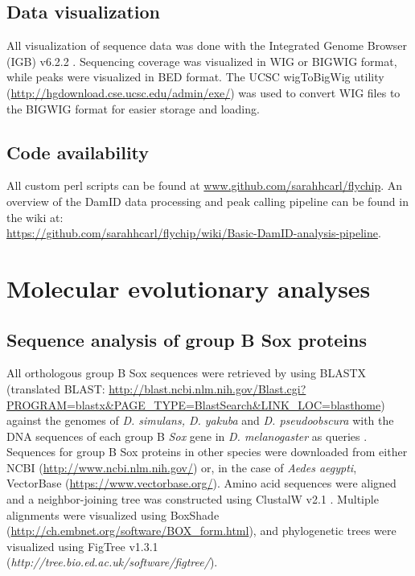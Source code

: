 \subsection{Data visualization}
All visualization of sequence data was done with the Integrated Genome Browser (IGB) v6.2.2 \citep{nicol_integrated_2009}. Sequencing coverage was visualized in WIG or BIGWIG format, while peaks were visualized in BED format. The UCSC wigToBigWig utility (\url{http://hgdownload.cse.ucsc.edu/admin/exe/}) was used to convert WIG files to the BIGWIG format for easier storage and loading.

\subsection{Code availability}
All custom perl scripts can be found at \url{www.github.com/sarahhcarl/flychip}. An overview of the DamID data processing and peak calling pipeline can be found in the wiki at:\\
\url{https://github.com/sarahhcarl/flychip/wiki/Basic-DamID-analysis-pipeline}.

\section{Molecular evolutionary analyses}
\subsection{Sequence analysis of group B Sox proteins}
All orthologous group B Sox sequences were retrieved by using BLASTX (translated BLAST: \url{http://blast.ncbi.nlm.nih.gov/Blast.cgi?PROGRAM=blastx&PAGE_TYPE=BlastSearch&LINK_LOC=blasthome}) against the genomes of \emph{D. simulans, D. yakuba} and \emph{D. pseudoobscura} with the DNA sequences of each group B \emph{Sox} gene in \emph{D. melanogaster} as queries \citep{altschul_basic_1990}. Sequences for group B Sox proteins in other species were downloaded from either NCBI (\url{http://www.ncbi.nlm.nih.gov/}) or, in the case of \emph{Aedes aegypti}, VectorBase (\url{https://www.vectorbase.org/}). Amino acid sequences were aligned and a neighbor-joining tree was constructed using ClustalW v2.1 \citep{chenna_multiple_2003}. Multiple alignments were visualized using BoxShade (\url{http://ch.embnet.org/software/BOX_form.html}), and phylogenetic trees were visualized using FigTree v1.3.1\\
(\emph{http://tree.bio.ed.ac.uk/software/figtree/}).

